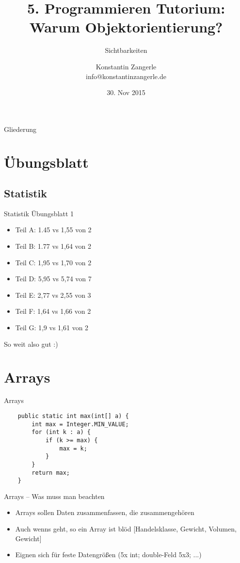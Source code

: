 \documentclass[18pt]{beamer}
\title[Programmieren Tutorium]{5. Programmieren Tutorium:\texorpdfstring{\\}{} Warum Objektorientierung?}
\subtitle{Sichtbarkeiten}
\author{Konstantin Zangerle \texorpdfstring{\\}{} info@konstantinzangerle.de}
\date{30. Nov 2015}
\begin{document}

\begin{frame}
\titlepage
\end{frame}

\begin{frame}{Gliederung}
\tableofcontents
\end{frame}

\section{Übungsblatt}

\subsection{Statistik}
\begin{frame}{Statistik Übungsblatt 1}
\begin{itemize}
 \item Teil A: 1.45 vs 1,55 von 2 
 \item Teil B: 1.77 vs 1,64 von 2 	
 \item Teil C: 1,95 vs 1,70 von 2 	
 \item Teil D: 5,95 vs 5,74 von 7	
 \item Teil E: 2,77 vs 2,55 von 3
 \item Teil F: 1,64 vs 1,66 von 2
 \item Teil G: 1,9 vs 1,61 von 2
\end{itemize}
So weit also gut :)
\end{frame}


\section{Arrays} %


\begin{frame}[fragile]{Arrays}
 \begin{lstlisting}
    public static int max(int[] a) {
        int max = Integer.MIN_VALUE;
        for (int k : a) {
            if (k >= max) {
                max = k;
            }
        }
        return max;
    }
 \end{lstlisting}
\end{frame}

\begin{frame}{Arrays – Was muss man beachten}
 \begin{itemize}
  \item Arrays sollen Daten zusammenfassen, die zusammengehören
  \item Auch wenns geht, so ein Array ist blöd [Handelsklasse, Gewicht, Volumen, Gewicht]
  \item Eignen sich für feste Datengrößen (5x int; double-Feld 5x3; ...)
 \end{itemize}

\end{frame}
\end{document}
